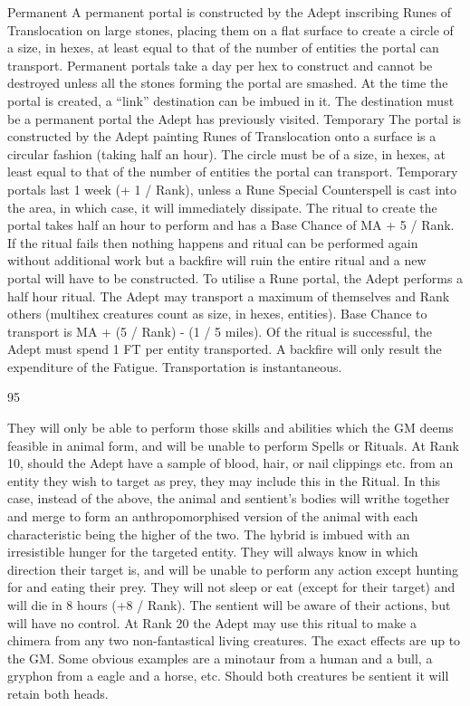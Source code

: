 \documentclass[a4paper]{article}
\begin{document}
\begin{multicols}{3}
Permanent A permanent portal is constructed by
the Adept inscribing Runes of Translocation on
large stones, placing them on a flat surface to create a circle of a size, in hexes, at least equal to that
of the number of entities the portal can transport.
Permanent portals take a day per hex to construct
and cannot be destroyed unless all the stones forming the portal are smashed. At the time the portal is
created, a “link” destination can be imbued in it.
The destination must be a permanent portal the
Adept has previously visited.
Temporary The portal is constructed by the Adept
painting Runes of Translocation onto a surface is a
circular fashion (taking half an hour). The circle
must be of a size, in hexes, at least equal to that of
the number of entities the portal can transport.
Temporary portals last 1 week (+ 1 / Rank), unless
a Rune Special Counterspell is cast into the area, in
which case, it will immediately dissipate.
The ritual to create the portal takes half an hour to
perform and has a Base Chance of MA + 5 / Rank.
If the ritual fails then nothing happens and ritual
can be performed again without additional work
but a backfire will ruin the entire ritual and a new
portal will have to be constructed.
To utilise a Rune portal, the Adept performs a half
hour ritual. The Adept may transport a maximum
of themselves and Rank others (multihex creatures
count as size, in hexes, entities). Base Chance to
transport is MA + (5 / Rank) - (1 / 5 miles). Of the
ritual is successful, the Adept must spend 1 FT per
entity transported. A backfire will only result the
expenditure of the Fatigue. Transportation is instantaneous.

95

They will only be able to perform those skills and
abilities which the GM deems feasible in animal
form, and will be unable to perform Spells or Rituals.
At Rank 10, should the Adept have a sample of
blood, hair, or nail clippings etc. from an entity
they wish to target as prey, they may include this in
the Ritual. In this case, instead of the above, the
animal and sentient’s bodies will writhe together
and merge to form an anthropomorphised version
of the animal with each characteristic being the
higher of the two. The hybrid is imbued with an
irresistible hunger for the targeted entity. They will
always know in which direction their target is, and
will be unable to perform any action except hunting for and eating their prey. They will not sleep or
eat (except for their target) and will die in 8 hours
(+8 / Rank). The sentient will be aware of their
actions, but will have no control. At Rank 20 the
Adept may use this ritual to make a chimera from
any two non-fantastical living creatures. The exact
effects are up to the GM. Some obvious examples
are a minotaur from a human and a bull, a gryphon
from a eagle and a horse, etc. Should both creatures be sentient it will retain both heads.


\end{multicols}
\end{document}
